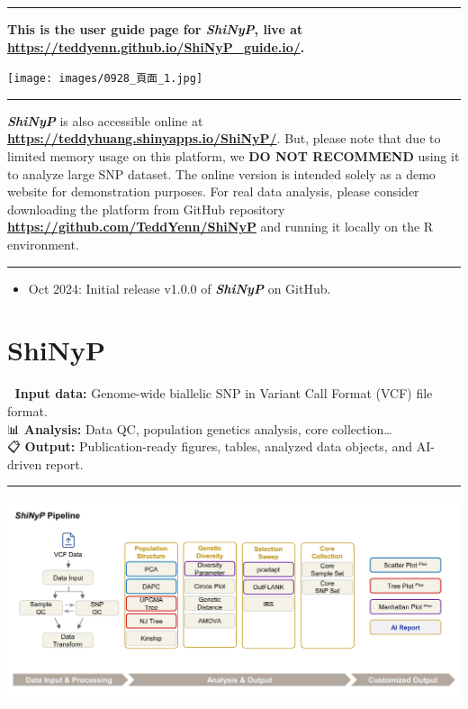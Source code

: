 \documentclass[
]{book}
\providecommand{\tightlist}{%
  \setlength{\itemsep}{0pt}\setlength{\parskip}{0pt}}
\begin{document}
\begin{center}\rule{0.5\linewidth}{0.5pt}\end{center}

\textbf{This is the user guide page for {\emph{ShiNyP}}, live at \url{https://teddyenn.github.io/ShiNyP_guide.io/}.}

\texttt{[image: images/0928\_頁面\_1.jpg]}

\begin{center}\rule{0.5\linewidth}{0.5pt}\end{center}

{\textbf{\emph{ShiNyP}}} is also accessible online at \href{https://teddyhuang.shinyapps.io/ShiNyP/}{\textbf{https://teddyhuang.shinyapps.io/ShiNyP/}}. But, please note that due to limited memory usage on this platform, we {\textbf{DO NOT RECOMMEND}} using it to analyze large SNP dataset. The online version is intended solely as a demo website for demonstration purposes. For real data analysis, please consider downloading the platform from GitHub repository \href{https://github.com/TeddYenn/ShiNyP}{\textbf{https://github.com/TeddYenn/ShiNyP}} and running it locally on the R environment.

\begin{center}\rule{0.5\linewidth}{0.5pt}\end{center}

\begin{itemize}
\tightlist
\item
  Oct 2024: Initial release v1.0.0 of {\textbf{\emph{ShiNyP}}} on GitHub.
\end{itemize}

\chapter{ShiNyP}\label{sec-shinyp}

📄 \textbf{Input data:} Genome-wide biallelic SNP in Variant Call Format (VCF) file format.\\
📊 \textbf{Analysis:} Data QC, population genetics analysis, core collection\ldots{}\\
📋 \textbf{Output:} Publication-ready figures, tables, analyzed data objects, and AI-driven report.

\begin{center}\rule{0.5\linewidth}{0.5pt}\end{center}

\includegraphics{images/Fig. 1-01.jpg}
\end{document}
